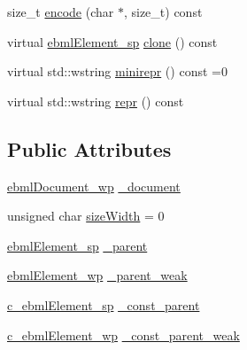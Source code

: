 \begin{DoxyCompactItemize}
\item 
size\+\_\+t \mbox{\hyperlink{classebml_1_1ebmlElement_a90dcd3bd8e37160b21b9faed3cecd49c}{encode}} (char $\ast$, size\+\_\+t) const
\item 
virtual \mbox{\hyperlink{namespaceebml_adad533b7705a16bb360fe56380c5e7be}{ebml\+Element\+\_\+sp}} \mbox{\hyperlink{classebml_1_1ebmlElement_a94013f01b6f12c9c66864d44983dce47}{clone}} () const
\item 
virtual std\+::wstring \mbox{\hyperlink{classebml_1_1ebmlElement_a7852173aeef78bd843939ae5a82f1d1c}{minirepr}} () const =0
\item 
virtual std\+::wstring \mbox{\hyperlink{classebml_1_1ebmlElement_a77865a71f4bab782817ec82e88fb5198}{repr}} () const
\end{DoxyCompactItemize}
\subsection*{Public Attributes}
\begin{DoxyCompactItemize}
\item 
\mbox{\hyperlink{namespaceebml_acfead4f724a6f8d55c730c6fbd362cea}{ebml\+Document\+\_\+wp}} \mbox{\hyperlink{classebml_1_1ebmlElement_ab76c2988a2f78c3ab057a53ebdef38ba}{\+\_\+document}}
\item 
unsigned char \mbox{\hyperlink{classebml_1_1ebmlElement_a8f324bc8c7d54856a51592204d5012b2}{size\+Width}} = 0
\item 
\mbox{\hyperlink{namespaceebml_adad533b7705a16bb360fe56380c5e7be}{ebml\+Element\+\_\+sp}} \mbox{\hyperlink{classebml_1_1ebmlElement_a5521124a98cbff8f29e61ecb7f265d6a}{\+\_\+parent}}
\item 
\mbox{\hyperlink{namespaceebml_a495fb58b42b0050d887415351af02935}{ebml\+Element\+\_\+wp}} \mbox{\hyperlink{classebml_1_1ebmlElement_ac4ae374c7897e4f8800ca6e0e1592bf9}{\+\_\+parent\+\_\+weak}}
\item 
\mbox{\hyperlink{namespaceebml_a2deef4e8071531b32e3533f1bf978917}{c\+\_\+ebml\+Element\+\_\+sp}} \mbox{\hyperlink{classebml_1_1ebmlElement_aad279b8a7e1b5613bc566be381a8a7bd}{\+\_\+const\+\_\+parent}}
\item 
\mbox{\hyperlink{namespaceebml_abc218c2fc1444b2fd8a8a5fae67e0151}{c\+\_\+ebml\+Element\+\_\+wp}} \mbox{\hyperlink{classebml_1_1ebmlElement_acadf2a9253bc91eb7d217a50499587cb}{\+\_\+const\+\_\+parent\+\_\+weak}}
\end{DoxyCompactItemize}
